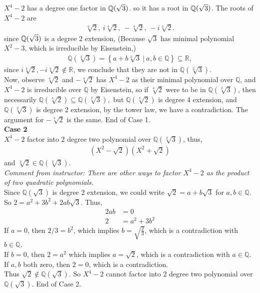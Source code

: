 \documentclass[12pt,english]{article}
\begin{document}
$X^4 -2$ has a degree one factor in $\mathbb{Q}(\sqrt{3})$. 
so it has a root in $\mathbb{Q}(\sqrt{3})$. The roots of $X^4 - 2$ are
\begin{align}
    \sqrt[4]{2}, \ i \sqrt[4]{2}, \ - \sqrt[4]{2}, \ - i \sqrt[4]{2}. 
\end{align}
since $\mathbb{Q} (\sqrt{3})$ is a degree $2$ extension, 
(Because $\sqrt{3}$ has minimal polynomial $X^2 -3$, which is irreducible by Eisenstein,)
\begin{align}
    \mathbb{Q}(\sqrt[2]{3}) = \left\{ a + b \sqrt[2]{3} \ | \ a,b \in \mathbb{Q} \right\} \subseteq \mathbb{R},
\end{align}
since $i \sqrt[4]{2}, - i \sqrt[4]{2} \not\in \mathbb{R}$,
we conclude that they are not in $\mathbb{Q}(\sqrt[2]{3})$.\\
Now, observe $\sqrt[4]{2}$ and $- \sqrt[4]{2}$ 
has $X^4 - 2$ as their minimal polynomial over $\mathbb{Q}$,
and $X^4 -2$ is irreducible over $\mathbb{Q}$ by Eisenstein,
so if $\sqrt[4]{2}$ were to be in $\mathbb{Q}(\sqrt[2]{3})$,
then necessarily $\mathbb{Q}(\sqrt[4]{2}) \subseteq \mathbb{Q}(\sqrt[2]{3}),$
but $\mathbb{Q}(\sqrt[4]{2})$ is degree 4 extension,
and $\mathbb{Q}(\sqrt[2]{3})$ is degree 2 extension,
by the tower law, we have a contradiction.
The argument for $- \sqrt[4]{2}$ is the same. End of Case 1.\\
\textbf{Case 2}\\
$X^4 - 2$ factor into 2 degree two polynomial over $\mathbb{Q}(\sqrt[2]{3})$, thus,
\begin{align}
    (X^2 - \sqrt{2})(X^2 + \sqrt{2})
\end{align} 
and $\sqrt[2]{2} \in \mathbb{Q}(\sqrt[2]{3}).$\\
\textit{Comment from instructor: There are other ways to factor
$X^4 - 2$ as the product of two quadratic polynomials.}\\
Since $\mathbb{Q}(\sqrt{3})$ is degree 2 extension, we could write
$\sqrt{2} = a + b \sqrt{3}$ for $a,b \in \mathbb{Q}$.\\
So $2 = a^2 + 3 b^2 + 2ab \sqrt{3}$. Thus,
\begin{align}
    2ab &= 0\\
    2 &= a^2 + 3b^2
\end{align}
If $a=0$, then $2/3 = b^2$, which implies $b=\sqrt{\frac{ 2 }{ 3 }}$, 
which is a contradiction with $b \in \mathbb{Q}$.\\
If $b=0$, then $2=a^2$ which implies $a = \sqrt{2}$, 
which is a contradiction with $a \in \mathbb{Q}$.\\
If $a,b$ both zero, then $2=0$, which is a contradiction.\\
Thus $\sqrt{2} \not\in \mathbb{Q}(\sqrt{3})$. 
So $X^4 - 2$ cannot factor into 2 degree two polynomial over $\mathbb{Q}(\sqrt{3})$.
End of Case 2.
\end{document}
